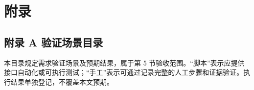 \section{附录}\label{sec:6-附录}

\subsection*{附录 A 验证场景目录}
\label{sec:附录-a-验证场景目录}

本目录规定需求验证场景及预期结果，属于第 5 节验收范围。“脚本”表示应提供接口自动化或可执行测试；“手工”表示可通过记录完整的人工步骤和证据验证。执行结果单独登记，不覆盖本文预期。

